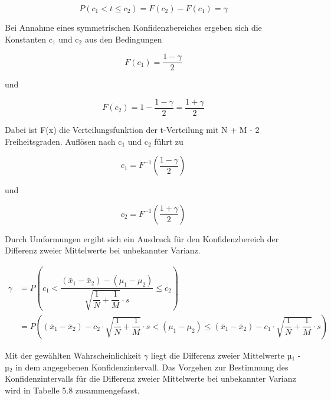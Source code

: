 \begin{equation}\label{eq:fiveeightyeight}
P\left(c_{1} <t\le c_{2} \right)=F\left(c_{2} \right)-F\left(c_{1} \right)=\gamma
\end{equation}

\noindent Bei Annahme eines symmetrischen Konfidenzbereiches ergeben sich die Konstanten c$_{1}$ und c$_{2}$ aus den Bedingungen

\begin{equation}\label{eq:fiveeightynine}
F(c_{1})=\dfrac{1-\gamma}{2}
\end{equation}

\noindent und 

\begin{equation}\label{eq:fiveninety}
F(c_{2})=1-\dfrac{1-\gamma}{2} =\dfrac{1+\gamma}{2}
\end{equation}

\noindent Dabei ist F(x) die Verteilungsfunktion der t-Verteilung mit N + M - 2 Freiheitsgraden. Aufl\"{o}sen nach c${}_{1}$ und c${}_{2}$ f\"{u}hrt zu

\begin{equation}\label{eq:fiveninetyone}
c_{1} =F^{-1} \left(\dfrac{1-\gamma }{2} \right)
\end{equation}

\noindent und

\begin{equation}\label{eq:fiveninetytwo}
c_{2} =F^{-1} \left(\dfrac{1+\gamma }{2} \right)
\end{equation}

\noindent Durch Umformungen ergibt sich ein Ausdruck f\"{u}r den Konfidenzbereich der Differenz zweier Mittelwerte bei unbekannter Varianz.

\begin{equation}\label{eq:fiveninetythree}
\begin{split}
\gamma & = P\left(c_{1} <\dfrac{\left(\bar{x}_{1} -\bar{x}_{2} \right)-\left(\mu _{1} -\mu _{2} \right)}{\sqrt{\dfrac{1}{N} +\dfrac{1}{M} } \cdot s} \le c_{2} \right) \\ 
& = P\left(\left(\bar{x}_{1} -\bar{x}_{2} \right)-c_{2} \cdot \sqrt{\dfrac{1}{N} +\dfrac{1}{M} } \cdot s<\left(\mu _{1} -\mu _{2} \right)\le \left(\bar{x}_{1} -\bar{x}_{2} \right)-c_{1} \cdot \sqrt{\dfrac{1}{N} +\dfrac{1}{M} } \cdot s\right)  
\end{split}
\end{equation}

\noindent Mit der gew\"{a}hlten Wahrscheinlichkeit $\gamma$ liegt die Differenz zweier Mittelwerte µ$_{1}$ - µ$_{2}$ in dem angegebenen Konfidenzintervall. Das Vorgehen zur Bestimmung des Konfidenzintervalls f\"{u}r die Differenz zweier Mittelwerte bei unbekannter Varianz wird in Tabelle 5.8 zusammengefasst.

